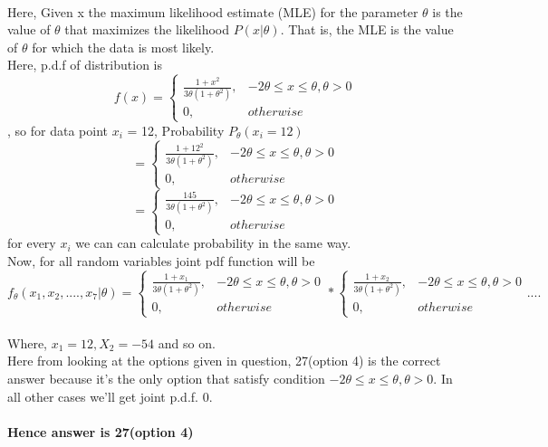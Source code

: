 \documentclass{article}
\begin{document}
\paragraph{}
Here, Given x the maximum likelihood estimate (MLE) for the parameter \(\theta\) is the value of \(\theta\) that maximizes the likelihood \(P(x | \theta)\). That is, the MLE is the value of \(\theta\) for which the data is most likely.
\\
Here, p.d.f of distribution is \[
    f(x)= 
\begin{cases}
\frac{1 + x^2}{3\theta(1+\theta^2)},& -2\theta \leq x \leq \theta, \theta > 0\\
    0,              & otherwise
\end{cases}
\], so for data point \(x_i\) = 12, Probability \(P_\theta(x_i = 12)\)  \[= \begin{cases}
\frac{1 + 12^2}{3\theta(1+\theta^2)},& -2\theta \leq x \leq \theta, \theta > 0\\
    0,              & otherwise
\end{cases}
\]
\[= \begin{cases}
\frac{145}{3\theta(1+\theta^2)},& -2\theta \leq x \leq \theta, \theta > 0\\
    0,              & otherwise
\end{cases}
\] 
for every \(x_i\) we can can calculate probability in the same way. \\
Now, for all random variables joint pdf function will be 
\[f_\theta(x_1,x_2,....,x_7 | \theta)= \begin{cases}
\frac{1 + x_1}{3\theta(1+\theta^2)},& -2\theta \leq x \leq \theta, \theta > 0\\
    0,              & otherwise
\end{cases} * \begin{cases}
\frac{1 + x_2}{3\theta(1+\theta^2)},& -2\theta \leq x \leq \theta, \theta > 0\\
    0,              & otherwise
\end{cases} ....
\] 
\\ 
Where, \(x_1 = 12, X_2 = -54\) and so on.
\\ Here from looking at the options given in question, 27(option 4) is the correct answer because it's the only option that satisfy condition \(-2\theta \leq x \leq \theta , \theta > 0\). In all other cases we'll get joint p.d.f. 0.
\\\paragraph{}
\textbf{Hence answer is 27(option 4)}
\end{document}
